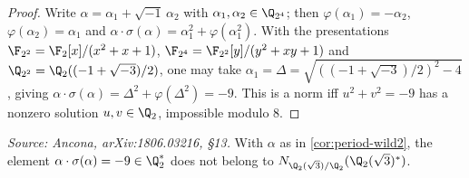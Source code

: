 \begin{proof}
  Write \(\alpha = \alpha_1 + \sqrt{-1}\,\alpha_2\) with
  \(\alpha_1, \alpha_2 \in \Q_{2^4}\); then \(\varphi(\alpha_1) = -\alpha_2\),
  \(\varphi(\alpha_2) = \alpha_1\) and \(\alpha \cdot \sigma(\alpha) = \alpha_1^2
  + \varphi(\alpha_1^2)\). With the presentations \(\F_{2^2} = \F_2[x]/(x^2 + x
  + 1)\), \(\F_{2^4} = \F_{2^2}[y]/(y^2 + xy + 1)\) and \(\Q_{2^2} =
  \Q_2((-1+\sqrt{-3})/2)\), one may take \(\alpha_1 = \Delta =
  \sqrt{((-1+\sqrt{-3})/2)^2 - 4}\), giving \(\alpha \cdot \sigma(\alpha) =
  \Delta^2 + \varphi(\Delta^2) = -9\). This is a norm iff \(u^2 + v^2 = -9\) has
  a nonzero solution \(u, v \in \Q_2\), impossible modulo \(8\).
\end{proof}

\begin{lemma}[\(-9\) is not a norm, \(F = \Q_2(\sqrt 3)\)]
  \label{lem:not-norm-wild2}
  \textit{Source: Ancona, arXiv:1806.03216, \S13.}
  With \(\alpha\) as in \cref{cor:period-wild2}, the element
  \(\alpha \cdot \sigma(\alpha) = -9 \in \Q_2^*\) does not belong to
  \(N_{\Q_2(\sqrt 3)/\Q_2}(\Q_2(\sqrt 3)^*)\).
\end{lemma}

